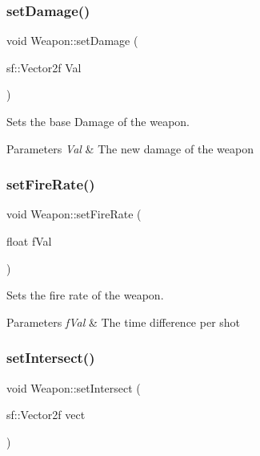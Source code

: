 \subsubsection{\texorpdfstring{set\+Damage()}{setDamage()}}
{\footnotesize\ttfamily void Weapon\+::set\+Damage (\begin{DoxyParamCaption}\item[{sf\+::\+Vector2f}]{Val }\end{DoxyParamCaption})}



Sets the base Damage of the weapon. 


\begin{DoxyParams}{Parameters}
{\em Val} & The new damage of the weapon \\
\hline
\end{DoxyParams}
\mbox{\label{class_weapon_a4d9b20ea5832e7bcfd386bcf280acbea}} 
\subsubsection{\texorpdfstring{set\+Fire\+Rate()}{setFireRate()}}
{\footnotesize\ttfamily void Weapon\+::set\+Fire\+Rate (\begin{DoxyParamCaption}\item[{float}]{f\+Val }\end{DoxyParamCaption})}



Sets the fire rate of the weapon. 


\begin{DoxyParams}{Parameters}
{\em f\+Val} & The time difference per shot \\
\hline
\end{DoxyParams}
\mbox{\label{class_weapon_a72df1e4f1ff0bfd059ff68ed70ee1f6b}} 
\subsubsection{\texorpdfstring{set\+Intersect()}{setIntersect()}}
{\footnotesize\ttfamily void Weapon\+::set\+Intersect (\begin{DoxyParamCaption}\item[{sf\+::\+Vector2f}]{vect }\end{DoxyParamCaption})}




